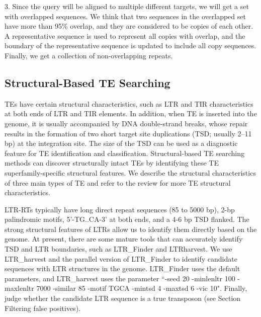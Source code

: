\documentclass{bmcart}
\begin{document}
3. Since the query will be aligned to multiple different targets, we will get a set with overlapped sequences. We think that two sequences in the overlapped set have more than 95\% overlap, and they are considered to be copies of each other. A representative sequence is used to represent all copies with overlap, and the boundary of the representative sequence is updated to include all copy sequences. Finally, we get a collection of non-overlapping repeats.

\subsection*{Structural-Based TE Searching}
TEs have certain structural characteristics, such as LTR and TIR characteristics at both ends of LTR and TIR elements. In addition, when TE is inserted into the genome, it is usually accompanied by DNA double-strand breaks, whose repair results in the formation of two short target site duplications (TSD; usually 2–11 bp) at the integration site. The size of the TSD can be used as a diagnostic feature for TE identification and classification. Structural-based TE searching methods can discover structurally intact TEs by identifying these TE superfamily-specific structural features. We describe the structural characteristics of three main types of TE and refer to the review for more TE structural characteristics\cite{wicker2007unified}.

LTR-RTs typically have long direct repeat sequences (85 to 5000 bp), 2-bp palindromic motifs, 5'-TG..CA-3' at both ends, and a 4-6 bp TSD flanked. The strong structural features of LTRs allow us to identify them directly based on the genome. At present, there are some mature tools that can accurately identify TSD and LTR boundaries, such as LTR\_Finder and LTRharvest. We use LTR\_harvest and the parallel version of LTR\_Finder\cite{ou2019ltr_finder_parallel} to identify candidate sequences with LTR structures in the genome. LTR\_Finder uses the default parameters, and LTR\_harvest uses the parameter ``-seed 20 -minlenltr 100 -maxlenltr 7000 -similar 85 -motif TGCA -mintsd 4 -maxtsd 6 -vic 10".  Finally, judge whether the candidate LTR sequence is a true transposon (see Section Filtering false positives).
\end{document}
